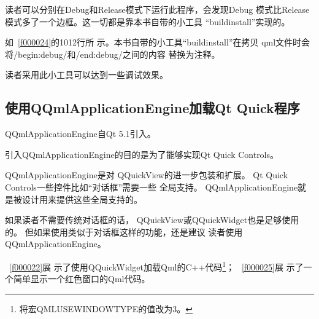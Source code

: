 读者可以分别在Debug和Release模式下运行此程序，会发现Debug
模式比Release模式多了一个边框。这一切都是靠本书自带的小工具
“build\underline{\hspace{0.5em}}install”实现的。

如\filesourcenumbernameone\ \ref{f000024}的10\raisebox{0.16ex}{\sourcefonttwo\~{}}12行所
示。本书自带的小工具“build\underline{\hspace{0.5em}}install”在拷贝
qml文件时会将/\raisebox{-0.35ex}{\sourcefonttwo{}*}begin:debug\raisebox{-0.35ex}{\sourcefonttwo{}*}/和/\raisebox{-0.35ex}{\sourcefonttwo{}*}end:debug\raisebox{-0.35ex}{\sourcefonttwo{}*}/之间的内容
替换为注释。

读者采用此小工具可以达到一些调试效果。

\FloatBarrier
\subsection{
使用QQmlApplicationEngine加载Qt Quick程序
}\label{ss001210}


QQmlApplicationEngine自Qt 5.1引入。

引入QQmlApplicationEngine的目的是为了能够实现Qt Quick Controls。

QQmlApplicationEngine是对
QQuickView的进一步包装和扩展。
Qt Quick Controls一些控件比如“对话框”需要一些
全局支持。
QQmlApplicationEngine就是被设计用来提供这些全局支持的。

如果读者不需要传统对话框的话，
QQuickView或QQuickWidget也是足够使用的。
但如果使用类似于对话框这样的功能，还是建议
读者使用QQmlApplicationEngine。

\filesourcenumbernameone\ \ref{f000022}展
示了使用QQuickWidget加载Qml的C{\sourcefonttwo{}+}{\sourcefonttwo{}+}代码\footnote{
将宏QML\underline{\hspace{0.5em}}USE\underline{\hspace{0.5em}}WINDOW\underline{\hspace{0.5em}}TYPE的值改为3。
}；
\filesourcenumbernameone\ \ref{f000025}展
示了一个简单显示一个红色窗口的Qml代码。

